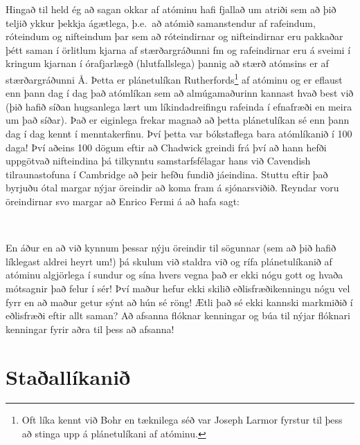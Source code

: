 Hingað til held ég að sagan okkar af atóminu hafi fjallað um atriði sem að þið teljið ykkur þekkja ágætlega, þ.e.~að atómið samanstendur af rafeindum, róteindum og nifteindum þar sem að róteindirnar og nifteindirnar eru pakkaðar þétt saman í örlitlum kjarna af stærðargráðunni \si{fm} og rafeindirnar eru á sveimi í kringum kjarnan í órafjarlægð (hlutfallslega) þannig að stærð atómsins er af stærðargráðunni \si{\AA}. Þetta er plánetulíkan Rutherfords\footnote{Oft líka kennt við Bohr en tæknilega séð var Joseph Larmor fyrstur til þess að stinga upp á plánetulíkani af atóminu.} af atóminu og er eflaust enn þann dag í dag það atómlíkan sem að almúgamaðurinn kannast hvað best við (þið hafið síðan hugsanlega lært um líkindadreifingu rafeinda í efnafræði en meira um það síðar). Það er eiginlega frekar magnað að þetta plánetulíkan sé enn þann dag í dag kennt í menntakerfinu. Því þetta var bókstaflega bara atómlíkanið í 100 daga! Því aðeins 100 dögum eftir að Chadwick greindi frá því að hann hefði uppgötvað nifteindina þá tilkynntu samstarfsfélagar hans við Cavendish tilraunastofuna í Cambridge að þeir hefðu fundið jáeindina. Stuttu eftir það byrjuðu ótal margar nýjar öreindir að koma fram á sjónarsviðið. Reyndar voru öreindirnar svo margar að Enrico Fermi á að hafa sagt:

\begin{tcolorbox}

 \\

\vspace{-0.3cm}
\end{tcolorbox}

En áður en að við kynnum þessar nýju öreindir til sögunnar (sem að þið hafið líklegast aldrei heyrt um!) þá skulum við staldra við og rífa plánetulíkanið af atóminu algjörlega í sundur og sína hvers vegna það er ekki nógu gott og hvaða mótsagnir það felur í sér! Því maður hefur ekki skilið eðlisfræðikenningu nógu vel fyrr en að maður getur sýnt að hún sé röng! Ætli það sé ekki kannski markmiðið í eðlisfræði eftir allt saman? Að afsanna flóknar kenningar og búa til nýjar flóknari kenningar fyrir aðra til þess að afsanna! \\


\section{Staðallíkanið}

